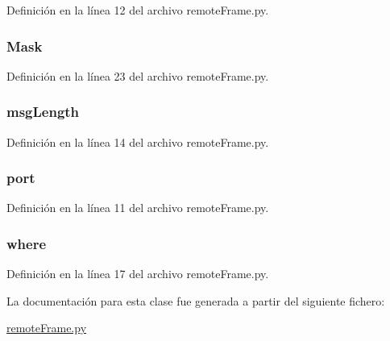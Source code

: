 Definición en la línea 12 del archivo remote\+Frame.\+py.

\hypertarget{classremoteFrame_1_1remoteFrame_a291536e8bf5e2f42dec8ed3f82b13487}{
\subsubsection[{Mask}]{\setlength{\rightskip}{0pt plus 5cm}Mask}}\label{classremoteFrame_1_1remoteFrame_a291536e8bf5e2f42dec8ed3f82b13487}


Definición en la línea 23 del archivo remote\+Frame.\+py.

\hypertarget{classremoteFrame_1_1remoteFrame_a643996cc8d402d1005166f956adfe0da}{
\subsubsection[{msg\+Length}]{\setlength{\rightskip}{0pt plus 5cm}msg\+Length}}\label{classremoteFrame_1_1remoteFrame_a643996cc8d402d1005166f956adfe0da}


Definición en la línea 14 del archivo remote\+Frame.\+py.

\hypertarget{classremoteFrame_1_1remoteFrame_af8fb0f45ee0195c7422a49e6a8d72369}{
\subsubsection[{port}]{\setlength{\rightskip}{0pt plus 5cm}port}}\label{classremoteFrame_1_1remoteFrame_af8fb0f45ee0195c7422a49e6a8d72369}


Definición en la línea 11 del archivo remote\+Frame.\+py.

\hypertarget{classremoteFrame_1_1remoteFrame_aec4a6f499c74a3d34d4dfe9930c9e115}{
\subsubsection[{where}]{\setlength{\rightskip}{0pt plus 5cm}where}}\label{classremoteFrame_1_1remoteFrame_aec4a6f499c74a3d34d4dfe9930c9e115}


Definición en la línea 17 del archivo remote\+Frame.\+py.



La documentación para esta clase fue generada a partir del siguiente fichero\+:\begin{DoxyCompactItemize}
\item 
\hyperlink{remoteFrame_8py}{remote\+Frame.\+py}\end{DoxyCompactItemize}
